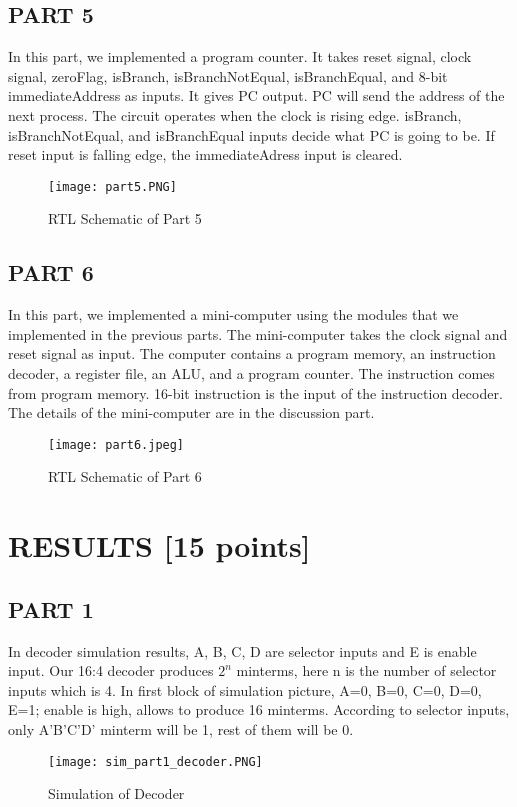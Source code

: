 \documentclass[pdftex,12pt,a4paper]{article}
\begin{document}
\clearpage

\subsection{PART 5}

In this part, we implemented a program counter. It takes reset signal, clock signal, zeroFlag, isBranch, isBranchNotEqual, isBranchEqual, and 8-bit immediateAddress as inputs. It gives PC output. PC will send the address of the next process. The circuit operates when the clock is rising edge.  isBranch, isBranchNotEqual, and isBranchEqual inputs decide what PC is going to be. If reset input is falling edge, the immediateAdress input is cleared.

\begin{figure}[ht]
	\centering
	\texttt{[image: part5.PNG]}	
	\caption{RTL Schematic of Part 5}
	\label{fig1}
\end{figure}

\clearpage
\subsection{PART 6}
In this part, we implemented a mini-computer using the modules that we implemented in the previous parts. The mini-computer takes the clock signal and reset signal as input. The computer contains a program memory, an instruction decoder, a register file, an ALU, and a program counter. The instruction comes from program memory.  16-bit instruction is the input of the instruction decoder. The details of the mini-computer are in the discussion part.
\begin{figure}[ht]
	\centering
	\texttt{[image: part6.jpeg]}	
	\caption{RTL Schematic of Part 6}
	\label{fig1}
\end{figure}
\clearpage

\section{RESULTS [15 points]}
\subsection{PART 1}
In decoder simulation results, A, B, C, D are selector inputs and E is enable input. Our 16:4 decoder produces \(2^n\) minterms, here n is the number of selector inputs which is 4. In first block of simulation picture, A=0, B=0, C=0, D=0, E=1; enable is high, allows to produce 16 minterms. According to selector inputs, only A’B’C’D’ minterm will be 1, rest of them will be 0.
\begin{figure}[ht]
	\centering
	\texttt{[image: sim\_part1\_decoder.PNG]}	
	\caption{Simulation of Decoder}
	\label{fig1}
\end{figure}
\end{document}
